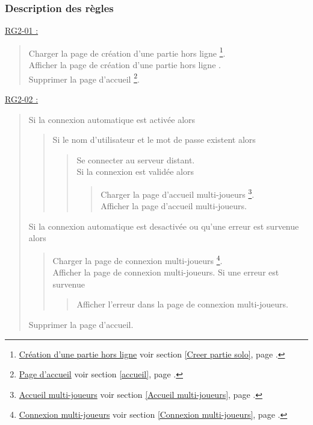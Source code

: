 \documentclass{report}
\begin{document}
\newpage

		\subsubsection{Description des règles}
		
		\underline{RG2-01 :}
			\begin{quote}
				Charger la page de création d'une partie hors ligne%
					\footnote{
						\hyperlink{Creer partie solo}{Création d'une partie hors ligne}
						\og voir section \ref{Creer partie solo}, page \pageref{Creer partie solo}.\fg
					}.\\
				Afficher la page de création d'une partie hors ligne \footnotemark[1].\\
				Supprimer la page d'accueil%
					\footnote{
						\hyperlink{Page d'accueil}{Page d'accueil}
						\og voir section \ref{accueil}, page \pageref{accueil}.\fg
					}.\\ 
			\end{quote}


		\underline{RG2-02 :}
			\begin{quote}
				Si la connexion automatique est activée alors
				\begin{quote}
					Si le nom d'utilisateur et le mot de passe existent alors
					\begin{quote}
						Se connecter au serveur distant.\\
						Si la connexion est validée alors
						\begin{quote}
							Charger la page d'accueil multi-joueurs%
					\footnote{
						\hyperlink{Accueil multi-joueurs}{Accueil multi-joueurs}
						\og voir section \ref{Accueil multi-joueurs}, page \pageref{Accueil multi-joueurs}.\fg
					}.\\
							Afficher la page d'accueil multi-joueurs\footnotemark[3].\\
						\end{quote}
					\end{quote}	
				\end{quote}
				Si la connexion automatique est desactivée ou qu'une erreur est survenue alors 
				\begin{quote}		
					Charger la page de connexion multi-joueurs%
						\footnote{
							\hyperlink{Connexion multi-joueurs}{Connexion multi-joueurs}
							\og voir section \ref{Connexion multi-joueurs}, page \pageref{Connexion multi-joueurs}.\fg
						}.\\
					Afficher la page de connexion multi-joueurs\footnotemark[4].
					Si une erreur est survenue
					\begin{quote}
						Afficher l'erreur dans la page de connexion multi-joueurs\footnotemark[4].
					\end{quote}
				\end{quote}
				Supprimer la page d'accueil\footnotemark[2].\\
			\end{quote}
\end{document}
